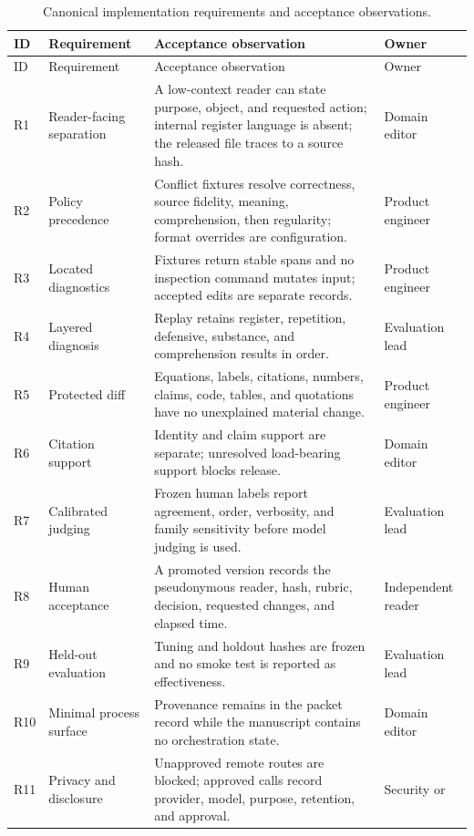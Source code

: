 \begin{longtable}{@{}p{}p{}p{}p{}@{}}
\caption{Canonical implementation requirements and acceptance observations.}
\label{tab:expanded-requirements}\\
\toprule
ID & Requirement & Acceptance observation & Owner \\
\midrule
\endfirsthead
\toprule
ID & Requirement & Acceptance observation & Owner \\
\midrule
\endhead
R1 & Reader-facing separation & A low-context reader can state purpose, object,
and requested action; internal register language is absent; the released file
traces to a source hash. & Domain editor \\
R2 & Policy precedence & Conflict fixtures resolve correctness, source fidelity,
meaning, comprehension, then regularity; format overrides are configuration. &
Product engineer \\
R3 & Located diagnostics & Fixtures return stable spans and no inspection
command mutates input; accepted edits are separate records. & Product engineer \\
R4 & Layered diagnosis & Replay retains register, repetition, defensive,
substance, and comprehension results in order. & Evaluation lead \\
R5 & Protected diff & Equations, labels, citations, numbers, claims, code,
tables, and quotations have no unexplained material change. & Product engineer \\
R6 & Citation support & Identity and claim support are separate; unresolved
load-bearing support blocks release. & Domain editor \\
R7 & Calibrated judging & Frozen human labels report agreement, order,
verbosity, and family sensitivity before model judging is used. & Evaluation lead \\
R8 & Human acceptance & A promoted version records the pseudonymous reader,
hash, rubric, decision, requested changes, and elapsed time. & Independent reader \\
R9 & Held-out evaluation & Tuning and holdout hashes are frozen and no smoke
test is reported as effectiveness. & Evaluation lead \\
R10 & Minimal process surface & Provenance remains in the packet record while
the manuscript contains no orchestration state. & Domain editor \\
R11 & Privacy and disclosure & Unapproved remote routes are blocked; approved
calls record provider, model, purpose, retention, and approval. & Security or

\end{longtable}
